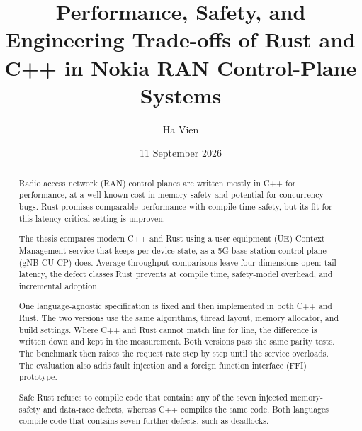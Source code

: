 \documentclass[english,oneside,a4paper,censored,csm,software-track-2020]{HYthesisML}
\title{Performance, Safety, and Engineering Trade-offs of Rust and C++ in Nokia RAN Control-Plane Systems}
\author{Ha Vien}
\date{11 September 2026}
\begin{document}
\maketitle

{\singlespacing
\begin{otherlanguage}{english}
\begin{abstract}
      \setlength{\parskip}{1ex}
      Radio access network (RAN) control planes are written mostly in C++ for performance, at a
      well-known cost in memory safety and potential for concurrency bugs. Rust promises comparable performance with
      compile-time safety, but its fit for this latency-critical setting is unproven.
      
      The thesis compares modern C++ and Rust using a user equipment (UE) Context Management
      service that keeps per-device state, as a 5G base-station control plane (gNB-CU-CP) does.
      Average-throughput comparisons leave four dimensions open: tail latency, the defect classes
      Rust prevents at compile time, safety-model overhead, and incremental adoption.
      
      One language-agnostic specification is fixed and then implemented in both C++ and Rust.
      The two versions use the same algorithms, thread layout, memory allocator, and build settings.
      Where C++ and Rust cannot match line for line, the difference is written down and kept in
      the measurement. Both versions pass the same parity tests. The benchmark then raises the request
      rate step by step until the service overloads. The evaluation also adds fault injection and
      a foreign function interface (FFI) prototype.
      
      Safe Rust refuses to compile code that contains any of the seven injected memory-safety
      and data-race defects, whereas C++ compiles the same code. Both languages compile code
      that contains seven further defects, such as deadlocks.


\end{abstract}
\end{otherlanguage}}
\end{document}
